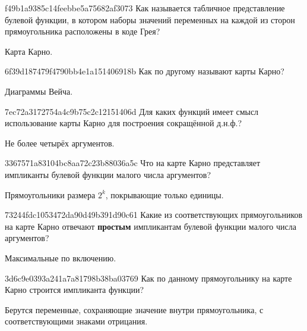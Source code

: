 \begin{note}{f49b1a9385c14feebbe5a75682af3073}
    Как называется табличное представление булевой функции, в котором наборы значений переменных на каждой из сторон прямоугольника расположены в коде Грея?

    \begin{cloze}{1}
        Карта Карно.
    \end{cloze}
\end{note}

\begin{note}{6f39d187479f4790bb4e1a151406918b}
    Как по другому называют карты Карно?

    \begin{cloze}{1}
        Диаграммы Вейча.
    \end{cloze}
\end{note}

\begin{note}{7ec72a3172754a4c9b75c2c12151406d}
    Для каких функций имеет смысл использование карты Карно для построения сокращённой д.н.ф.?

    \begin{cloze}{1}
        Не более четырёх аргументов.
    \end{cloze}
\end{note}

\begin{note}{3367571a83104bc8aa72c23b88036a5c}
    Что на карте Карно представляет импликанты булевой функции малого числа аргументов?

    \begin{cloze}{1}
        Прямоугольники размера \({ 2^{k} }\), покрывающие только единицы.
    \end{cloze}
\end{note}

\begin{note}{73244fdc1053472da90d49b391d90c61}
    Какие из соответствующих прямоугольников на карте Карно отвечают \textbf{простым} импликантам булевой функции малого числа аргументов?

    \begin{cloze}{1}
        Максимальные по включению.
    \end{cloze}
\end{note}

\begin{note}{3d6c9e0393a241a7a81798b38ba03769}
    Как по данному прямоугольнику на карте Карно строится импликанта функции?

    \begin{cloze}{1}
        Берутся переменные, сохраняющие значение внутри прямоугольника, с соответствующими знаками отрицания.
    \end{cloze}
\end{note}

